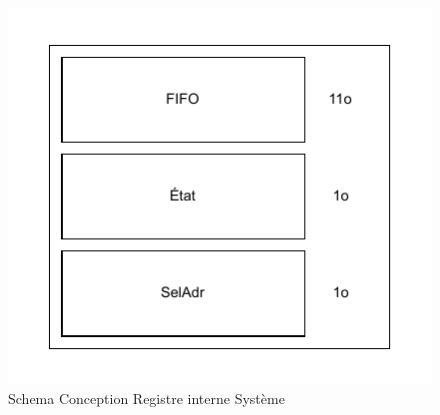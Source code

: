 \begin{figure}[H]
    \centering
    \includegraphics[width=0.8\linewidth]{images/CDC/Schema_Fifi_etat.pdf}
    \caption{Schema Conception Registre interne Système}
    \label{fig:placeholder}
\end{figure}

